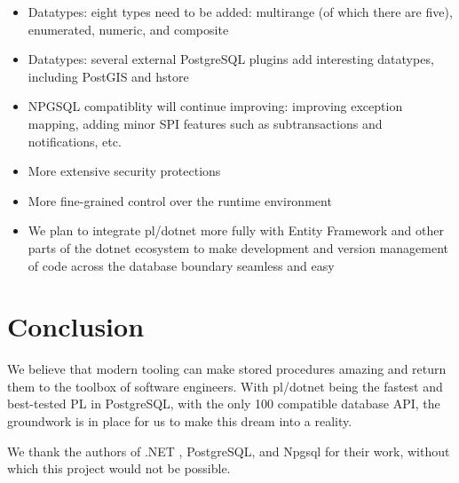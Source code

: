 \documentclass[sigconf,techreport,authorversion,nonacm]{acmart}
\newcommand{\dotnet}{.NET }
\begin{document}
\begin{itemize}[itemsep=0pt]
    \item Datatypes: eight types need to be added: multirange (of which there are five), enumerated, numeric, and composite
    \item Datatypes: several external PostgreSQL plugins add interesting datatypes, including PostGIS and hstore
    \item NPGSQL compatiblity will continue improving: improving exception mapping, adding minor SPI features such as subtransactions and notifications, etc.
    \item More extensive security protections
    \item More fine-grained control over the runtime environment
    \item We plan to integrate pl/dotnet more fully with Entity Framework and other parts of the dotnet ecosystem to make development and version management of code across the database boundary seamless and easy
\end{itemize}

\section{Conclusion}

We believe that modern tooling can make stored procedures amazing
and return them to the toolbox of software engineers.  With pl/dotnet
being the fastest and best-tested PL in PostgreSQL, with the only 100%
compatible database API, the groundwork is in place for us to make this
dream into a reality.

We thank the authors of \dotnet, PostgreSQL, and Npgsql for their work,
without which this project would not be possible.


\pagebreak

\balance




\tableofcontents
\end{document}
